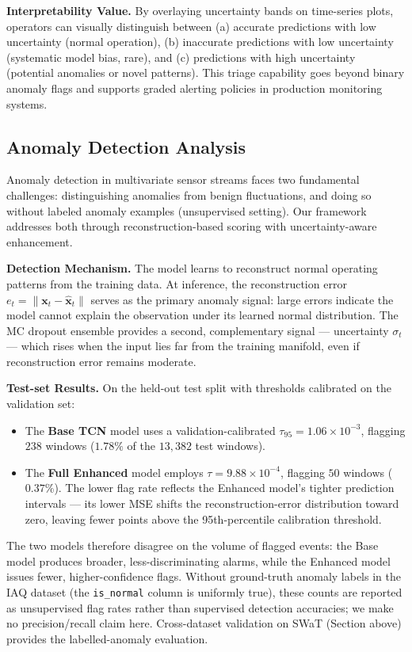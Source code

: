 \textbf{Interpretability Value.} By overlaying uncertainty bands on time-series plots, operators can visually distinguish between (a) accurate predictions with low uncertainty (normal operation), (b) inaccurate predictions with low uncertainty (systematic model bias, rare), and (c) predictions with high uncertainty (potential anomalies or novel patterns). This triage capability goes beyond binary anomaly flags and supports graded alerting policies in production monitoring systems.

\subsection{Anomaly Detection Analysis}

Anomaly detection in multivariate sensor streams faces two fundamental challenges: distinguishing anomalies from benign fluctuations, and doing so without labeled anomaly examples (unsupervised setting). Our framework addresses both through reconstruction-based scoring with uncertainty-aware enhancement.

\textbf{Detection Mechanism.} The model learns to reconstruct normal operating patterns from the training data. At inference, the reconstruction error $e_t = \|\mathbf{x}_t - \hat{\mathbf{x}}_t\|$ serves as the primary anomaly signal: large errors indicate the model cannot explain the observation under its learned normal distribution. The MC dropout ensemble provides a second, complementary signal — uncertainty $\sigma_t$ — which rises when the input lies far from the training manifold, even if reconstruction error remains moderate.

\textbf{Test-set Results.} On the held-out test split with thresholds calibrated on the validation set:
\begin{itemize}
    \item The \textbf{Base TCN} model uses a validation-calibrated $\tau_{95} = 1.06\times 10^{-3}$, flagging $238$ windows ($1.78\%$ of the $13{,}382$ test windows).
    \item The \textbf{Full Enhanced} model employs $\tau = 9.88\times 10^{-4}$, flagging $50$ windows ($0.37\%$). The lower flag rate reflects the Enhanced model's tighter prediction intervals --- its lower MSE shifts the reconstruction-error distribution toward zero, leaving fewer points above the 95th-percentile calibration threshold.
\end{itemize}
The two models therefore disagree on the volume of flagged events: the Base model produces broader, less-discriminating alarms, while the Enhanced model issues fewer, higher-confidence flags. Without ground-truth anomaly labels in the IAQ dataset (the \texttt{is\_normal} column is uniformly true), these counts are reported as unsupervised flag rates rather than supervised detection accuracies; we make no precision/recall claim here. Cross-dataset validation on SWaT (Section above) provides the labelled-anomaly evaluation.

